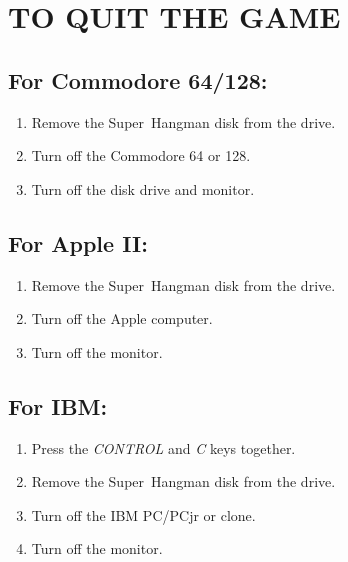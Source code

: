 \section{TO QUIT THE GAME}


\subsection{For Commodore 64/128:}
\begin{enumerate}
\item Remove the \mbox{Super Hangman} disk from the drive.
\item Turn off the Commodore 64 or 128.
\item Turn off the disk drive and monitor.
\end{enumerate}

\subsection{For Apple II:}
\begin{enumerate}
\item Remove the \mbox{Super Hangman} disk from the drive.
\item Turn off the Apple computer.
\item Turn off the monitor.
\end{enumerate}

\subsection{For IBM:}
\begin{enumerate}
\item Press the \emph{CONTROL} and \emph{C} keys together.
\item Remove the \mbox{Super Hangman} disk from the drive.
\item Turn off the IBM PC/PCjr or clone.
\item Turn off the monitor.\end{enumerate}

